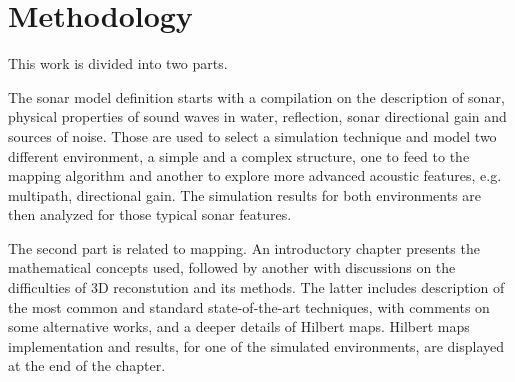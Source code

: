 

\section{Methodology}
 


% 


This work is divided into two parts.

The sonar model definition starts with a compilation on the description of
sonar, physical properties of sound waves in water, reflection, sonar
directional gain and sources of noise. Those are used to select a simulation
technique and model two different environment, a simple and a complex
structure, one to feed to the mapping algorithm and another to explore more
advanced acoustic features, e.g. multipath, directional gain. The simulation
results for both environments are then analyzed for those typical sonar
features.

The second part is related to mapping. An introductory chapter presents
the mathematical concepts used, followed by another with discussions on the
difficulties of 3D reconstution and its methods. The latter includes description
of the most common and standard state-of-the-art techniques, with comments on
some alternative works, and a deeper details of Hilbert maps. Hilbert maps
implementation and results, for one of the simulated environments, are
displayed at the end of the chapter.



